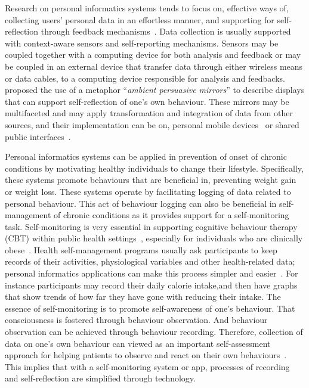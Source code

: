 Research on personal informatics systems tends to focus on, effective ways of, collecting users' personal data in an effortless manner, and supporting for self-reflection through feedback mechanisms~\citep{li2011understanding}. Data collection is usually supported with context-aware sensors and self-reporting mechanisms. Sensors may be coupled together with a computing device for both analysis and feedback or may be coupled in an external device that transfer data through either wireless means or data cables, to a computing device responsible for analysis and feedbacks.~\cite{nakajima2013designing} proposed the use of a metaphor ``\emph{ambient persuasive mirrors}'' to describe displays that can support self-reflection of one's own behaviour. These mirrors may be multifaceted and may apply transformation and integration of data from other sources, and their implementation can be on, personal mobile devices~\citep{klasnja2009:using} or shared public interfaces~\citep{lin2006:fish}.

Personal informatics systems can be applied in prevention of onset of chronic conditions by motivating healthy individuals to change their lifestyle. Specifically, these systems promote behaviours that are beneficial in, preventing weight gain or weight loss. These systems operate by facilitating logging of data related to personal behaviour. This act of behaviour logging can also be beneficial in self-management of chronic conditions as it provides support for a self-monitoring task. Self-monitoring is very essential in supporting cognitive behaviour therapy (CBT) within public health settings~\citep{mattila2008mobile}, especially for individuals who are clinically obese~\citep{nih2000practical}. Health self-management programs usually ask participants to keep records of their activities, physiological variables and other health-related data; personal informatics applications can make this process simpler and easier~\citep{medynskiy2010salud}. For instance participants may record their daily calorie intake,and then have graphs that show trends of how far they have gone with reducing their intake. The essence of self-monitoring is to promote self-awareness of one’s behaviour. That consciousness is fostered through behaviour observation. And behaviour observation can be achieved through behaviour recording. Therefore, collection of data on one's own behaviour can viewed as an important self-assessment approach for helping patients to observe and react on their own behaviours~\citep{rapp2014meaningful}. This implies that with a self-monitoring system or app, processes of recording and self-reflection are simplified through technology. 

